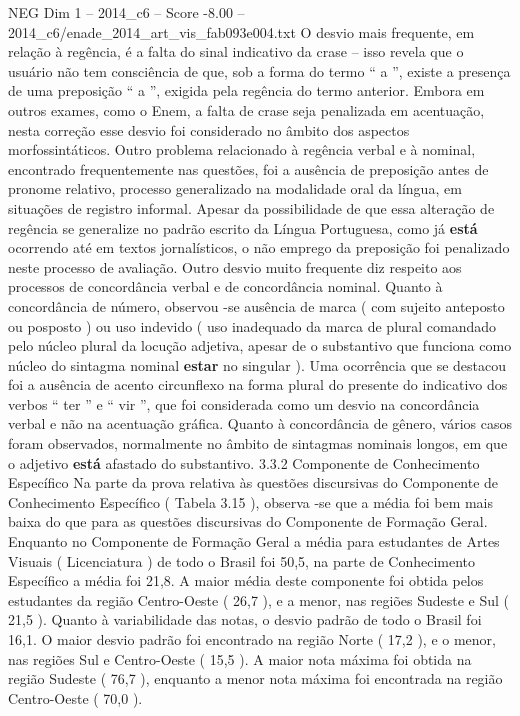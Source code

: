\begin{textsample}{NEG Dim 1 – 2014\_c6 – Score -8.00 – 2014\_c6/enade\_2014\_art\_vis\_fab093e004.txt}
O desvio mais frequente, em relação à regência, é a falta do sinal indicativo da crase – isso revela que o usuário não tem consciência de que, sob a forma do termo “ a ”, existe a presença de uma preposição “ a ”, exigida pela regência do termo anterior.
Embora em outros exames, como o Enem, a falta de crase seja penalizada em acentuação, nesta correção esse desvio foi considerado no âmbito dos aspectos morfossintáticos.
Outro problema relacionado à regência verbal e à nominal, encontrado frequentemente nas questões, foi a ausência de preposição antes de pronome relativo, processo generalizado na modalidade oral da língua, em situações de registro informal.
Apesar da possibilidade de que essa alteração de regência se generalize no padrão escrito da Língua Portuguesa, como já \textbf{está} ocorrendo até em textos jornalísticos, o não emprego da preposição foi penalizado neste processo de avaliação.
Outro desvio muito frequente diz respeito aos processos de concordância verbal e de concordância nominal.
Quanto à concordância de número, observou -se ausência de marca ( com sujeito anteposto ou posposto ) ou uso indevido ( uso inadequado da marca de plural comandado pelo núcleo plural da locução adjetiva, apesar de o substantivo que funciona como núcleo do sintagma nominal \textbf{estar} no singular ).
Uma ocorrência que se destacou foi a ausência de acento circunflexo na forma plural do presente do indicativo dos verbos “ ter ” e “ vir ”, que foi considerada como um desvio na concordância verbal e não na acentuação gráfica.
Quanto à concordância de gênero, vários casos foram observados, normalmente no âmbito de sintagmas nominais longos, em que o adjetivo \textbf{está} afastado do substantivo. 3.3.2 Componente de Conhecimento Específico Na parte da prova relativa às questões discursivas do Componente de Conhecimento Específico ( Tabela 3.15 ), observa -se que a média foi bem mais baixa do que para as questões discursivas do Componente de Formação Geral.
Enquanto no Componente de Formação Geral a média para estudantes de Artes Visuais ( Licenciatura ) de todo o Brasil foi 50,5, na parte de Conhecimento Específico a média foi 21,8.
A maior média deste componente foi obtida pelos estudantes da região Centro-Oeste ( 26,7 ), e a menor, nas regiões Sudeste e Sul ( 21,5 ).
Quanto à variabilidade das notas, o desvio padrão de todo o Brasil foi 16,1.
O maior desvio padrão foi encontrado na região Norte ( 17,2 ), e o menor, nas regiões Sul e Centro-Oeste ( 15,5 ).
A maior nota máxima foi obtida na região Sudeste ( 76,7 ), enquanto a menor nota máxima foi encontrada na região Centro-Oeste ( 70,0 ).

\end{textsample}
